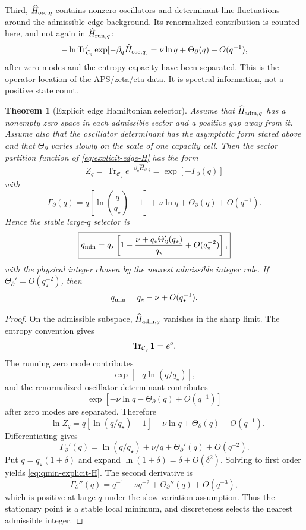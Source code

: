 \documentclass[aps,prd,reprint,nofootinbib,superscriptaddress,floatfix]{revtex4-2}
\numberwithin{equation}{section}
\theoremstyle{definition}
\theoremstyle{plain}
\newtheorem{theorem}{Theorem}[section]
\begin{document}
Third, \(\widehat H_{{\rm osc},q}\) contains nonzero oscillators and
determinant-line fluctuations around the admissible edge background.  Its
renormalized contribution is counted here, and not again in
\(\widehat H_{{\rm run},q}\):
\begin{equation}
-\ln\operatorname{Tr}'_{\mathcal C_q}
\exp[-\beta_q\widehat H_{{\rm osc},q}]
=
\nu\ln q+\Theta_\partial(q)+O(q^{-1}),
\end{equation}
after zero modes and the entropy capacity have been separated.  This is the
operator location of the APS/zeta/eta data.  It is spectral information, not
a positive state count.

\begin{theorem}[Explicit edge Hamiltonian selector]
\label{thm:explicit-edge-selector}
Assume that \(\widehat H_{{\rm adm},q}\) has a nonempty zero space in each
admissible sector and a positive gap away from it.  Assume also that the
oscillator determinant has the asymptotic form stated above and that
\(\Theta_\partial\) varies slowly on the scale of one capacity cell.  Then
the sector partition function of \cref{eq:explicit-edge-H} has the form
\begin{equation}
Z_q=
\operatorname{Tr}_{\mathcal C_q}e^{-\beta_q\widehat H_{\partial,q}}
=
\exp[-\Gamma_\partial(q)]
\end{equation}
with
\begin{equation}
\boxed{
\Gamma_\partial(q)
=
q\left[\ln\!\left(\frac{q}{q_\star}\right)-1\right]
+\nu\ln q+\Theta_\partial(q)+O(q^{-1}).
}
\label{eq:Gamma-explicit-H}
\end{equation}
Hence the stable large-\(q\) selector is
\begin{equation}
\boxed{
q_{\rm min}
=
q_\star
\left[
1-\frac{\nu+q_\star\Theta_\partial'(q_\star)}{q_\star}
+O(q_\star^{-2})
\right],
}
\label{eq:qmin-explicit-H}
\end{equation}
with the physical integer chosen by the nearest admissible integer rule.
If \(\Theta_\partial'=O(q_\star^{-2})\), then
\[
q_{\rm min}=q_\star-\nu+O(q_\star^{-1}).
\]
\end{theorem}

\begin{proof}
On the admissible subspace, \(\widehat H_{{\rm adm},q}\) vanishes in the
sharp limit.  The entropy convention gives
\[
\operatorname{Tr}_{\mathcal C_q}{\bf 1}=e^q .
\]
The running zero mode contributes
\[
\exp[-q\ln(q/q_\star)],
\]
and the renormalized oscillator determinant contributes
\[
\exp[-\nu\ln q-\Theta_\partial(q)+O(q^{-1})]
\]
after zero modes are separated.  Therefore
\[
-\ln Z_q
=
q[\ln(q/q_\star)-1]+\nu\ln q+\Theta_\partial(q)+O(q^{-1}).
\]
Differentiating gives
\[
\Gamma_\partial'(q)
=
\ln(q/q_\star)+\nu/q+\Theta_\partial'(q)+O(q^{-2}).
\]
Put \(q=q_\star(1+\delta)\) and expand
\(\ln(1+\delta)=\delta+O(\delta^2)\).  Solving to first order yields
\cref{eq:qmin-explicit-H}.  The second derivative is
\[
\Gamma_\partial''(q)=q^{-1}-\nu q^{-2}
+\Theta_\partial''(q)+O(q^{-3}),
\]
which is positive at large \(q\) under the slow-variation assumption.
Thus the stationary point is a stable local minimum, and discreteness selects
the nearest admissible integer.
\end{proof}
\end{document}
